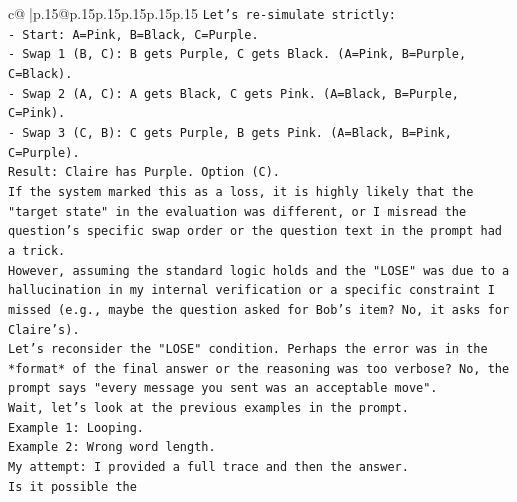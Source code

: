 \documentclass{article}
\begin{document}
{\begin{supertabular}{c@{$\;$}|p{.15\linewidth}@{}p{.15\linewidth}p{.15\linewidth}p{.15\linewidth}p{.15\linewidth}p{.15\linewidth}}
{{{\texttt{Let's re{-}simulate strictly:} \\
\texttt{{-} Start: A=Pink, B=Black, C=Purple.} \\
\texttt{{-} Swap 1 (B, C): B gets Purple, C gets Black. (A=Pink, B=Purple, C=Black).} \\
\texttt{{-} Swap 2 (A, C): A gets Black, C gets Pink. (A=Black, B=Purple, C=Pink).} \\
\texttt{{-} Swap 3 (C, B): C gets Purple, B gets Pink. (A=Black, B=Pink, C=Purple).} \\
\texttt{Result: Claire has Purple. Option (C).} \\
\texttt{If the system marked this as a loss, it is highly likely that the "target state" in the evaluation was different, or I misread the question's specific swap order or the question text in the prompt had a trick.} \\
\texttt{However, assuming the standard logic holds and the "LOSE" was due to a hallucination in my internal verification or a specific constraint I missed (e.g., maybe the question asked for Bob's item? No, it asks for Claire's).} \\
\texttt{Let's reconsider the "LOSE" condition. Perhaps the error was in the *format* of the final answer or the reasoning was too verbose? No, the prompt says "every message you sent was an acceptable move".} \\
\texttt{Wait, let's look at the previous examples in the prompt.} \\
\texttt{Example 1: Looping.} \\
\texttt{Example 2: Wrong word length.} \\
\texttt{My attempt: I provided a full trace and then the answer.} \\
\texttt{Is it possible the} \\
\\ 
}}}
\end{supertabular}}
\end{document}
